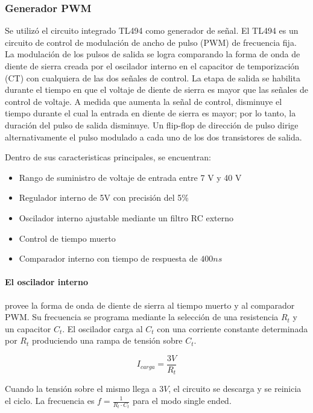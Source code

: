 
\subsubsection{Generador PWM}

Se utilizó el circuito integrado TL494 como generador de señal.
El TL494 es un circuito de control de modulación de ancho de pulso (PWM) de frecuencia fija. 
La modulación de los pulsos de salida se logra comparando la forma de onda de diente de sierra creada por el oscilador interno en el capacitor de temporización (CT) con cualquiera de las dos señales de control. 
La etapa de salida se habilita durante el tiempo en que el voltaje de diente de sierra es mayor que las señales de control de voltaje. 
A medida que aumenta la señal de control, disminuye el tiempo durante el cual la entrada en diente de sierra es mayor; por lo tanto, la duración del pulso de salida disminuye. 
Un flip-flop de dirección de pulso dirige alternativamente el pulso modulado a cada uno de los dos transistores de salida.

Dentro de sus caracteristicas principales, se encuentran:
\begin{itemize}
    \item Rango de suministro de voltaje de entrada entre 7 V y 40 V
    \item Regulador interno de 5V con precisión del 5\%
    \item Oscilador interno ajustable mediante un filtro RC externo
    \item Control de tiempo muerto
    \item Comparador interno con tiempo de respuesta de $400ns$
\end{itemize}


\paragraph{El oscilador interno} provee la forma de onda de diente de sierra al tiempo muerto y al comparador PWM. 
Su frecuencia se programa mediante la selección de una resistencia $R_t$ y un capacitor $C_t$. 
El oscilador carga al $C_t$ con una corriente constante determinada por $R_t$ produciendo una rampa de tensión sobre $C_t$.

$$ I_{carga}=\frac{3V}{R_t} $$

Cuando la tensión sobre el mismo llega a $3V$, el circuito se descarga y se reinicia el ciclo. 
La frecuencia es $f=\frac{1}{R_t\cdot C_t}$ para el modo single ended.

